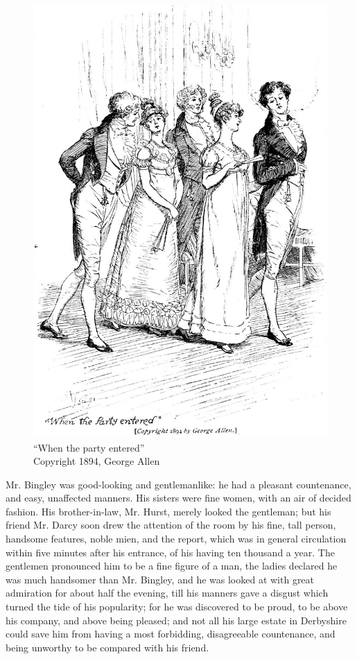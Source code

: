 \begin{figure}[htbp]
    \centering
    \includegraphics[width=\textwidth]{illustrations/i_041.jpg}
    \caption{“When the party entered”\\ Copyright 1894, George Allen}
    \label{fig:image}
\end{figure}

Mr. Bingley was good-looking and gentlemanlike: he had a pleasant countenance, and easy, unaffected manners. His sisters were fine women, with an air of decided fashion. His brother-in-law, Mr. Hurst, merely looked the gentleman; but his friend Mr. Darcy soon drew the attention of the room by his fine, tall person, handsome features, noble mien, and the report, which was in general circulation within five minutes after his entrance, of his having ten thousand a year. The gentlemen pronounced him to be a fine figure of a man, the ladies declared he was much handsomer than Mr. Bingley, and he was looked at with great admiration for about half the evening, till his manners gave a disgust which turned the tide of his popularity; for he was discovered to be proud, to be above his company, and above being pleased; and not all his large estate in Derbyshire could save him from having a most forbidding, disagreeable countenance, and being unworthy to be compared with his friend.

